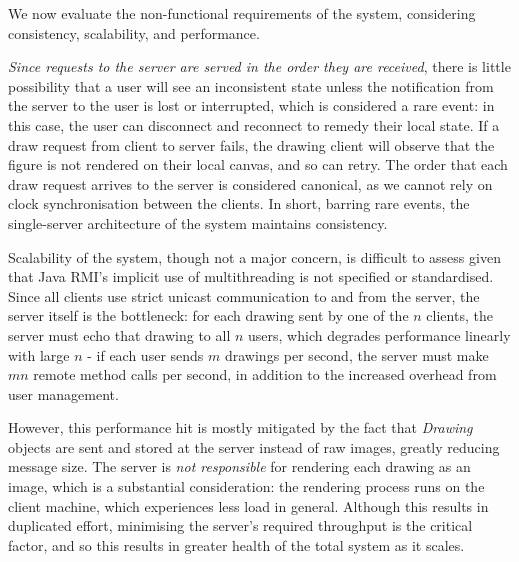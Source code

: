 \documentclass[12pt,a4paper]{article}
\begin{document}
We now evaluate the non-functional requirements of the system, considering consistency, scalability, and performance.

\textit{Since requests to the server are served in the order they are received}, there is little possibility that a user will see an inconsistent state unless the notification from the server to the user is lost or interrupted, which is considered a rare event: in this case, the user can disconnect and reconnect to remedy their local state. If a draw request from client to server fails, the drawing client will observe that the figure is not rendered on their local canvas, and so can retry. The order that each draw request arrives to the server is considered canonical, as we cannot rely on clock synchronisation between the clients. In short, barring rare events, the single-server architecture of the system maintains consistency. 

Scalability of the system, though not a major concern, is difficult to assess given that Java RMI's implicit use of multithreading is not specified or standardised. Since all clients use strict unicast communication to and from the server, the server itself is the bottleneck: for each drawing sent by one of the $n$ clients, the server must echo that drawing to all $n$ users, which degrades performance linearly with large $n$ - if each user sends $m$ drawings per second, the server must make $mn$ remote method calls per second, in addition to the increased overhead from user management. 

However, this performance hit is mostly mitigated by the fact that \textit{Drawing} objects are sent and stored at the server instead of raw images, greatly reducing message size. The server is \textit{not responsible} for rendering each drawing as an image, which is a substantial consideration: the rendering process runs on the client machine, which experiences less load in general. Although this results in duplicated effort, minimising the server's required throughput is the critical factor, and so this results in greater health of the total system as it scales.
\end{document}
